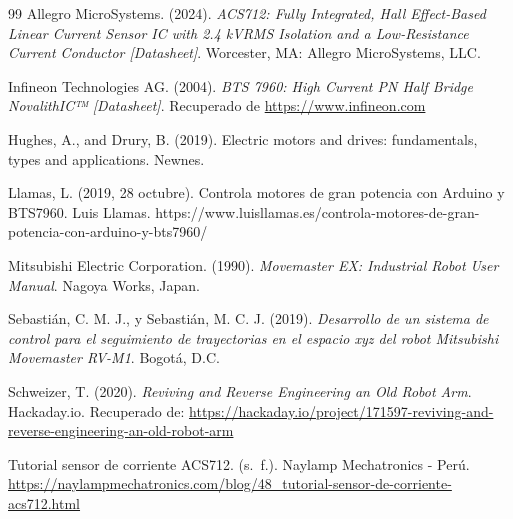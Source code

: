 \newpage
{} %
\begin{thebibliography}{99}
	Allegro MicroSystems. (2024). 
	\textit{ACS712: Fully Integrated, Hall Effect-Based Linear Current Sensor IC with 2.4 kVRMS Isolation and a Low-Resistance Current Conductor [Datasheet]}. Worcester, MA: Allegro MicroSystems, LLC.
	
	Infineon Technologies AG. (2004). \textit{BTS 7960: High Current PN Half Bridge NovalithIC™ [Datasheet]}. Recuperado de \url{https://www.infineon.com}
	
	Hughes, A., and Drury, B. (2019). Electric motors and drives: fundamentals, types and applications. Newnes.
	
	Llamas, L. (2019, 28 octubre). Controla motores de gran potencia con Arduino y BTS7960. Luis Llamas. https://www.luisllamas.es/controla-motores-de-gran-potencia-con-arduino-y-bts7960/
	
	Mitsubishi Electric Corporation. (1990). \textit{Movemaster EX: Industrial Robot User Manual}. Nagoya Works, Japan.
	
	Sebastián, C. M. J., y Sebastián, M. C. J. (2019). \textit{Desarrollo de un sistema de control para el seguimiento de trayectorias en el espacio xyz del robot Mitsubishi Movemaster RV-M1}. Bogotá, D.C. 
	
	Schweizer, T. (2020). \textit{Reviving and Reverse Engineering an Old Robot Arm}. Hackaday.io. Recuperado de: \url{https://hackaday.io/project/171597-reviving-and-reverse-engineering-an-old-robot-arm}
	
	Tutorial sensor de corriente ACS712. (s. f.). Naylamp Mechatronics - Perú. \url{https://naylampmechatronics.com/blog/48_tutorial-sensor-de-corriente-acs712.html}
	
\end{thebibliography}